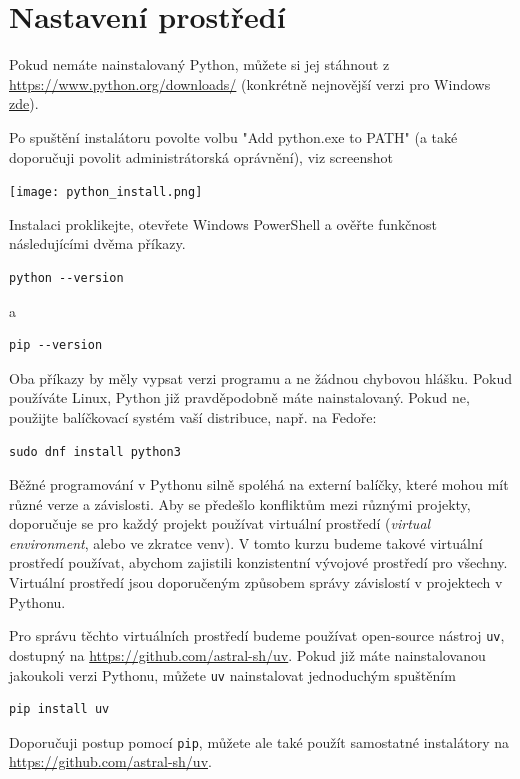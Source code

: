 \newpage
\section{Nastavení prostředí}

Pokud nemáte nainstalovaný Python, můžete si jej stáhnout z \url{https://www.python.org/downloads/} (konkrétně nejnovější
verzi pro Windows \href{https://www.python.org/ftp/python/3.13.7/python-3.13.7-amd64.exe}{zde}).

Po spuštění instalátoru povolte volbu "Add python.exe to PATH" (a také doporučuji povolit administrátorská oprávnění), viz screenshot
\begin{center}
    \texttt{[image: python\_install.png]}
\end{center}

Instalaci proklikejte, otevřete Windows PowerShell a ověřte funkčnost následujícími dvěma příkazy.

\begin{verbatim}
python --version
\end{verbatim}
a
\begin{verbatim}
pip --version
\end{verbatim}

Oba příkazy by měly vypsat verzi programu a ne žádnou chybovou hlášku. Pokud používáte Linux, Python již pravděpodobně máte nainstalovaný. Pokud ne, použijte balíčkovací systém vaší distribuce, např. na Fedoře:
\begin{verbatim}
sudo dnf install python3
\end{verbatim}

Běžné programování v Pythonu silně spoléhá na externí balíčky, které mohou mít různé verze a závislosti. Aby se předešlo konfliktům mezi různými projekty, doporučuje se pro každý projekt používat virtuální prostředí (\emph{virtual environment}, alebo ve zkratce venv). V tomto kurzu budeme takové virtuální prostředí používat, abychom zajistili konzistentní vývojové prostředí pro všechny. Virtuální prostředí jsou doporučeným způsobem správy závislostí v projektech v Pythonu.

Pro správu těchto virtuálních prostředí budeme používat open-source nástroj \verb|uv|, dostupný na \url{https://github.com/astral-sh/uv}. Pokud již máte nainstalovanou jakoukoli verzi Pythonu, můžete \verb|uv| nainstalovat jednoduchým spuštěním
\begin{lstlisting}
pip install uv
\end{lstlisting}
Doporučuji postup pomocí \verb|pip|, můžete ale také použít samostatné instalátory na \url{https://github.com/astral-sh/uv}.


